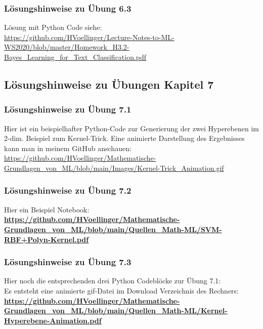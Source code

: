 \documentclass[12pt]{article}
\begin{document}
\subsubsection{Lösungshinweise zu Übung 6.3}

Lösung mit Python Code siehe:\\
\url{https://github.com/HVoellinger/Lecture-Notes-to-ML-WS2020/blob/master/Homework_H3.2-Bayes_Learning_for_Text_Classification.pdf}
\\[0.2cm]

\newpage

\subsection{Lösungshinweise zu Übungen Kapitel 7}

\subsubsection{Lösungshinweise zu Übung 7.1}
Hier ist ein beispielhafter Python-Code zur Generierung der zwei Hyperebenen im 2-dim. Beispiel zum Kernel-Trick. Eine animierte Darstellung des Ergebnisses kann man in meinem GitHub anschauen: \\[0.3cm]
\url{https://github.com/HVoellinger/Mathematische-Grundlagen_von_ML/blob/main/Images/Kernel-Trick_Animation.gif} \\[0.2cm]
%
\subsubsection{Lösungshinweise zu Übung 7.2}
Hier ein Beispiel Notebook:\\[0.2cm]
\textbf{\url{https://github.com/HVoellinger/Mathematische-Grundlagen_von_ML/blob/main/Quellen_Math-ML/SVM-RBF+Polyn-Kernel.pdf}}\\[0.2cm] 

\subsubsection{Lösungshinweise zu Übung 7.3}

Hier noch die entsprechenden drei Python Codeblöcke zur Übung 7.1:\\ 
Es entsteht eine animierte gif-Datei im Download Verzeichnis des Rechners:\\[0.2cm]
%
\textbf{\url{https://github.com/HVoellinger/Mathematische-Grundlagen_von_ML/blob/main/Quellen_Math-ML/Kernel-Hyperebene-Animation.pdf}}
\end{document}
